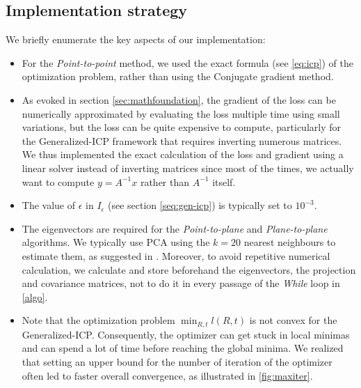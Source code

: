 \documentclass[11pt,letterpaper,leqno]{article}
\begin{document}
\subsection{Implementation strategy}
We briefly enumerate the key aspects of our implementation:
\begin{itemize}
    \item For the \textit{Point-to-point} method, we used the exact formula (see \ref{eq:icp}) of the optimization problem, rather than using the Conjugate gradient method.
    \item As evoked in section \ref{sec:mathfoundation}, the gradient of the loss can be numerically approximated by evaluating the loss multiple time using small variations, but the loss can be quite expensive to compute, particularly for the Generalized-ICP framework that requires inverting numerous matrices. We thus implemented the exact calculation of the loss and gradient using a linear solver instead of inverting matrices since most of the times, we actually want to compute $y = A^{-1}x$ rather than $A^{-1}$ itself.
    \item The value of $\epsilon$ in $I_\epsilon$ (see section \ref{seq:gen-icp}) is typically set to $10^{-3}$.
    \item The eigenvectors are required for the \textit{Point-to-plane} and \textit{Plane-to-plane} algorithms. We typically use PCA using the $k = 20$ nearest neighbours to estimate them, as suggested in \cite{generalized-icp}. Moreover, to avoid repetitive numerical calculation, we calculate and store beforehand the eigenvectors, the projection and covariance matrices, not to do it in every passage of the \textit{While} loop in \autoref{algo}.
    \item Note that the optimization problem $\min_{R,t} l(R,t)$ is not convex for the Generalized-ICP. Consequently, the optimizer can get stuck in local minimas and can spend a lot of time before reaching the global minima. We realized that setting an upper bound for the number of iteration of the optimizer often led to faster overall convergence, as illustrated in \ref{fig:maxiter}.
\end{itemize}
\end{document}
